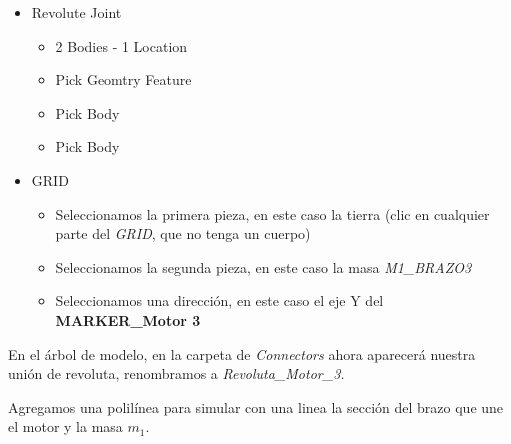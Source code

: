         \begin{scope}
            \renewcommand{\labelitemi}{\blacklozenge}
            \renewcommand{\labelitemii}{\checkmark}
            \begin{itemize}
                \item Revolute Joint
                \begin{itemize}
                    \item 2 Bodies - 1 Location
                    \item Pick Geomtry Feature
                    \item Pick Body
                    \item Pick Body
                \end{itemize}
                \item GRID 
                \begin{itemize}
                    \item Seleccionamos la primera pieza, en este caso la tierra (clic en cualquier parte del \textit{GRID}, que no tenga un cuerpo)
                    \item Seleccionamos la segunda pieza, en este caso la masa \textit{M1\_BRAZO3}
                    \item Seleccionamos una dirección, en este caso el eje Y del \textbf{MARKER\_Motor 3}
                \end{itemize}
            \end{itemize}
        \end{scope}
        
        En el árbol de modelo, en la carpeta de \textit{Connectors} ahora aparecerá nuestra unión de revoluta, renombramos a \textit{Revoluta\_Motor\_3. } 
        
        Agregamos una polilínea para simular con una linea la sección del brazo que une el motor y la masa $m_{1}$.
        
